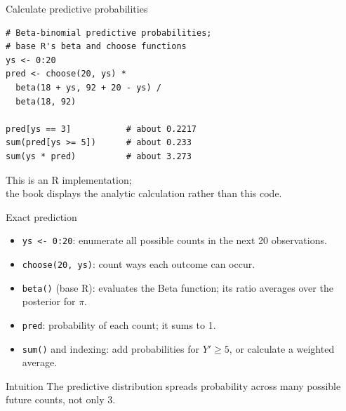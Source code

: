 \documentclass[aspectratio=43]{beamer}
\begin{document}
\begin{frame}[fragile]{Calculate predictive probabilities}
\begin{lstlisting}
# Beta-binomial predictive probabilities;
# base R's beta and choose functions
ys <- 0:20
pred <- choose(20, ys) *
  beta(18 + ys, 92 + 20 - ys) /
  beta(18, 92)

pred[ys == 3]           # about 0.2217
sum(pred[ys >= 5])      # about 0.233
sum(ys * pred)          # about 3.273
\end{lstlisting}
\footnotesize This is an R implementation;\\the book displays the analytic calculation rather than this code.
\end{frame}
\begin{frame}{Exact prediction}
\begin{itemize}
\item \texttt{ys <- 0:20}: enumerate all possible counts in the next 20 observations.
\item \texttt{choose(20, ys)}: count ways each outcome can occur.
\item \texttt{beta()} (base R): evaluates the Beta function; its ratio averages over the posterior for $\pi$.
\item \texttt{pred}: probability of each count; it sums to 1.
\item \texttt{sum()} and indexing: add probabilities for $Y'\ge5$, or calculate a weighted average.
\end{itemize}
\begin{block}{Intuition}
The predictive distribution spreads probability across many possible future counts, not only 3.
\end{block}
\end{frame}
\end{document}
